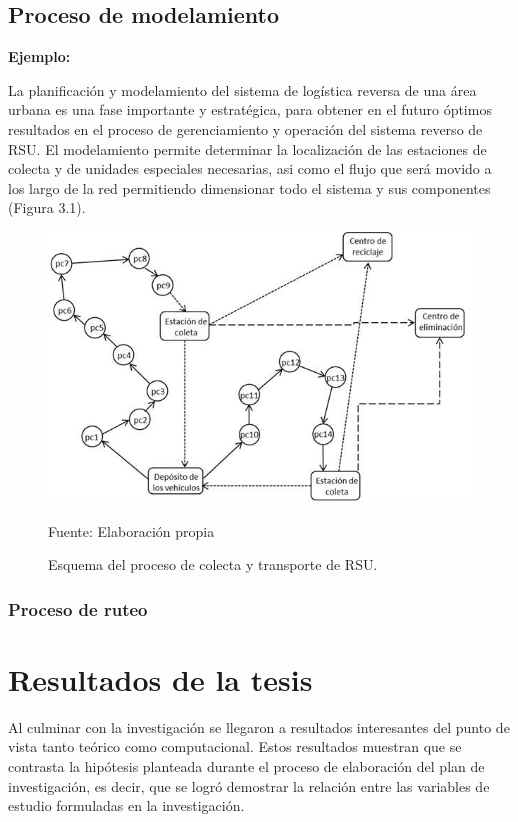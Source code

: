 \section{Proceso de modelamiento} 

{\bf Ejemplo:}\par

La planificación y modelamiento del sistema de logística reversa de una área urbana es una fase importante y estratégica, para obtener en el futuro óptimos resultados en el proceso de gerenciamiento y operación del sistema reverso de RSU. El modelamiento permite determinar la localización de las estaciones de colecta y de unidades especiales necesarias, asi como el flujo que será movido a los largo de la red permitiendo dimensionar todo el sistema y sus componentes (Figura 3.1).
\vskip 0.3cm
\begin{figure}[ht]
\begin{center}
\includegraphics[width=.6\textwidth]{image/Figura3}
\end{center}
\begin{center}
\vskip -0.5cm
\caption{\small{Esquema del proceso de colecta y transporte de RSU.}}
{\small{Fuente: Elaboración propia}}
\end{center}
\end{figure}

\subsection{Proceso de ruteo}



\chapter{Resultados de la tesis}


Al culminar con la investigación se llegaron a resultados interesantes del punto de vista tanto teórico como computacional. Estos resultados muestran que se contrasta la hipótesis planteada durante el proceso de elaboración del plan de investigación, es decir, que se logró demostrar la relación entre las variables de estudio formuladas en la investigación.

